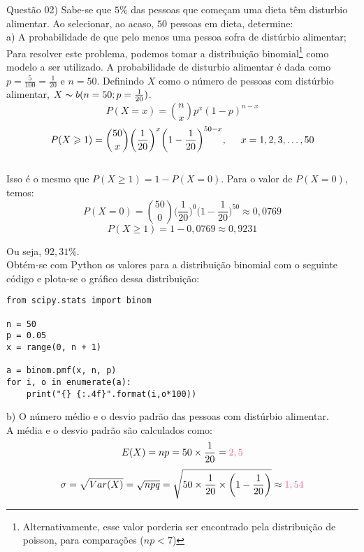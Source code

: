 
\noindent \textcolor{COLOR1}{Questão 02)} Sabe-se que $5\%$ das pessoas que começam uma dieta têm disturbio alimentar. Ao selecionar, ao acaso,
$50$ pessoas em dieta, determine:
\\

a) A probabilidade de que pelo menos uma pessoa sofra de distúrbio alimentar;
\\

Para resolver este problema, podemos tomar a distribuição binomial\footnote{Alternativamente, esse valor porderia ser encontrado pela distribuição de poisson, para comparações ($np<7$)} como modelo a ser utilizado. A probabilidade de disturbio alimentar é dada como $p=\frac{5}{100}=\frac{1}{20}$ e $n=50$. Definindo $X$ como o número de pessoas com distúrbio alimentar, $X \thicksim  b(n=50;p=\frac{1}{20})$.
\\

\[
    P(X=x)=\binom{n}{x}p^x(1-p)^{n-x}
\]
\[
    P(X\geqslant 1)=\binom{50}{x}\biggl(\frac{1}{20}\biggr)^x\biggl(1-\frac{1}{20}\biggr)^{50-x}, \hspace{0.5cm} x=1,2,3,\dots ,50
\]
\\

Isso é o mesmo que $P(X\geqslant 1)=1-P(X=0)$. Para o valor de $P(X=0)$, temos:\\

\[
    P(X=0)=\binom{50}{0}\biggl(\frac{1}{20}\biggr)^0\biggl(1-\frac{1}{20}\biggr)^{50}\approx 0,0769
\]
\[
    P(X\geqslant 1)=1-0,0769 \approx 0,9231
\]

Ou seja, \textcolor{COLOR2}{$92,31\%$}.
\\

Obtém-se com Python os valores para a distribuição binomial com o seguinte código e plota-se o gráfico dessa distribuição:\\

\begin{lstlisting}
from scipy.stats import binom

n = 50
p = 0.05
x = range(0, n + 1)
    
a = binom.pmf(x, n, p)
for i, o in enumerate(a):
    print("{} {:.4f}".format(i,o*100))
\end{lstlisting}




b) O número médio e o desvio padrão das pessoas com distúrbio alimentar.\\

A média e o desvio padrão são calculados como:\\

\[
    E(X) = np = 50\times\frac{1}{20} = \textcolor{COLOR2}{2,5}
\]
\[
    \sigma = \sqrt{Var(X)} = \sqrt{npq} = \sqrt{50 \times \frac{1}{20} \times \biggl(1-\frac{1}{20}\biggr)} \approx \textcolor{COLOR2}{1,54}
\]
